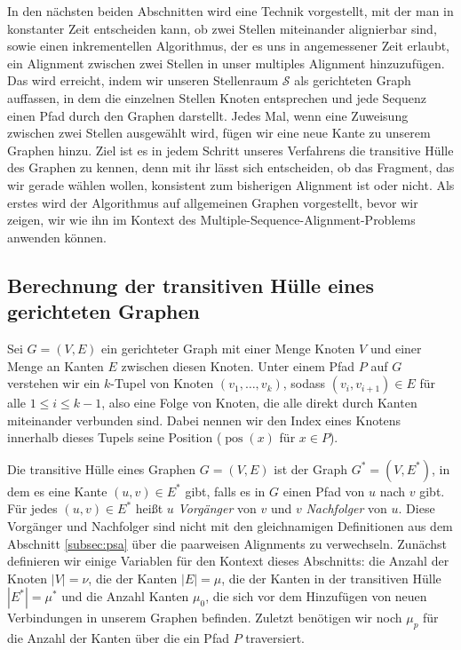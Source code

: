 In den nächsten beiden Abschnitten wird eine Technik vorgestellt, mit der man in konstanter Zeit entscheiden kann, ob zwei Stellen miteinander alignierbar sind, sowie einen inkrementellen Algorithmus, der es uns in angemessener Zeit erlaubt, ein Alignment zwischen zwei Stellen in unser multiples Alignment hinzuzufügen. Das wird erreicht, indem wir unseren Stellenraum $\mathcal{S}$ als gerichteten Graph auffassen, in dem die einzelnen Stellen Knoten entsprechen und jede Sequenz einen Pfad durch den Graphen darstellt. Jedes Mal, wenn eine Zuweisung zwischen zwei Stellen ausgewählt wird, fügen wir eine neue Kante zu unserem Graphen hinzu. Ziel ist es in jedem Schritt unseres Verfahrens die transitive Hülle des Graphen zu kennen, denn mit ihr lässt sich entscheiden, ob das Fragment, das wir gerade wählen wollen, konsistent zum bisherigen Alignment ist oder nicht. Als erstes wird der Algorithmus auf allgemeinen Graphen vorgestellt, bevor wir zeigen, wir wie ihn im Kontext des Multiple-Sequence-Alignment-Problems anwenden können.

\subsection{Berechnung der transitiven Hülle eines gerichteten Graphen}

Sei $G=(V,E)$ ein gerichteter Graph mit einer Menge Knoten $V$ und einer Menge an Kanten $E$ zwischen diesen Knoten. Unter einem Pfad $P$ auf $G$ verstehen wir ein $k$-Tupel von Knoten $(v_1, \dots, v_k)$, sodass $(v_i, v_{i+1}) \in E$ für alle $1 \leq i \leq k-1$, also eine Folge von Knoten, die alle direkt durch Kanten miteinander verbunden sind. Dabei nennen wir den Index eines Knotens innerhalb dieses Tupels seine Position ($\operatorname{pos}(x)$ für $x \in P$).

Die transitive Hülle eines Graphen $G = (V,E)$ ist der Graph $G^*=(V,E^*)$, in dem es eine Kante $(u,v) \in E^*$ gibt, falls es in $G$ einen Pfad von $u$ nach $v$ gibt. Für jedes $(u,v) \in E^*$ heißt $u$ \emph{Vorgänger} von $v$ und $v$ \emph{Nachfolger} von $u$. Diese Vorgänger und Nachfolger sind nicht mit den gleichnamigen Definitionen aus dem Abschnitt \ref{subsec:psa} über die paarweisen Alignments zu verwechseln. Zunächst definieren wir einige Variablen für den Kontext dieses Abschnitts: die Anzahl der Knoten $|V| = \nu$, die der Kanten $|E| = \mu$, die der Kanten in der transitiven Hülle $|E^*| = \mu^*$ und die Anzahl Kanten $\mu_0$, die sich vor dem Hinzufügen von neuen Verbindungen in unserem Graphen befinden. Zuletzt benötigen wir noch $\mu_p$ für die Anzahl der Kanten über die ein Pfad $P$ traversiert.


